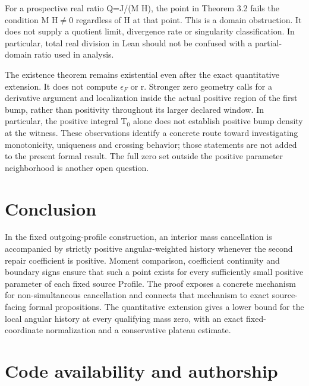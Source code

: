 \documentclass[11pt,a4paper]{article}
\begin{document}
For a prospective real ratio Q=J/(M H), the point in Theorem 3.2 fails the condition M H\ensuremath{\ne}0 regardless of H at that point. This is a domain obstruction. It does not supply a quotient limit, divergence rate or singularity classification. In particular, total real division in Lean should not be confused with a partial-domain ratio used in analysis.

The existence theorem remains existential even after the exact quantitative extension. It does not compute \(\epsilon _F\) or r. Stronger zero geometry calls for a derivative argument and localization inside the actual positive region of the first bump, rather than positivity throughout its larger declared window. In particular, the positive integral T\ensuremath{{}_0} alone does not establish positive bump density at the witness. These observations identify a concrete route toward investigating monotonicity, uniqueness and crossing behavior; those statements are not added to the present formal result. The full zero set outside the positive parameter neighborhood is another open question.

\section{Conclusion}

In the fixed outgoing-profile construction, an interior mass cancellation is accompanied by strictly positive angular-weighted history whenever the second repair coefficient is positive. Moment comparison, coefficient continuity and boundary signs ensure that such a point exists for every sufficiently small positive parameter of each fixed source Profile. The proof exposes a concrete mechanism for non-simultaneous cancellation and connects that mechanism to exact source-facing formal propositions. The quantitative extension gives a lower bound for the local angular history at every qualifying mass zero, with an exact fixed-coordinate normalization and a conservative plateau estimate.

\section*{Code availability and authorship}
\end{document}

